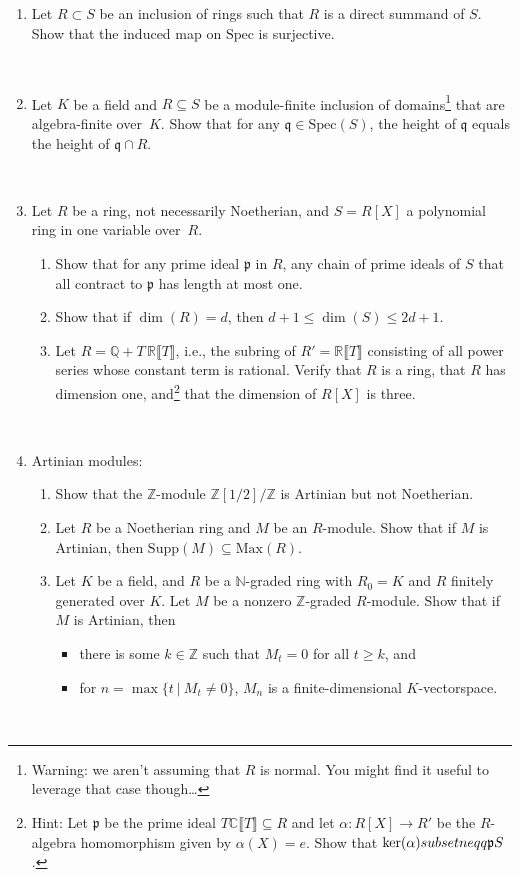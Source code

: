 \documentclass[12pt]{amsart}
\newcommand{\Q}{\mathbb{Q}}
\newcommand{\N}{\mathbb{N}}
\newcommand{\Z}{\mathbb{Z}}
\newcommand{\R}{\mathbb{R}}
\newcommand{\C}{\mathbb{C}}
\newcommand{\p}{\mathfrak{p}}
\newcommand{\q}{\mathfrak{q}}
\newcommand{\Spec}{\mathrm{Spec}}
\newcommand{\Supp}{\mathrm{Supp}}
\newcommand{\Max}{\mathrm{Max}}
\begin{document}
\begin{enumerate}

\item Let $R\subset S$ be an inclusion of rings such that $R$ is a direct summand of $S$. Show that the induced map on $\Spec$ is surjective.

\

\item Let $K$ be a field and $R\subseteq S$ be a module-finite inclusion of domains\footnote{Warning: we aren't assuming that $R$ is normal. You might find it useful to leverage that case though\dots} that are algebra-finite over~$K$. Show that  for any $\q \in \Spec(S)$, the height of $\q$ equals the height of $\q \cap R$.

\


\item Let $R$ be a ring, not necessarily Noetherian, and $S=R[X]$ a polynomial ring in one variable over~$R$.
\begin{enumerate} 
\item Show that for any prime ideal $\p$ in $R$, any chain of prime ideals of $S$ that all contract to $\p$ has length at most one.
\item Show that if $\dim(R)=d$, then $d+1 \leq \dim(S) \leq 2d+1$.
\item Let $R= \Q + T \,\R \llbracket T \rrbracket$, i.e., the subring of $R' = \R \llbracket T \rrbracket$ consisting of all power series whose constant term is rational. Verify that $R$ is a ring, that $R$ has dimension one, and\footnote{Hint: Let $\p$ be the prime ideal $T\C \llbracket T \rrbracket\subseteq R$ and let  $\alpha:R[X]\to R'$ be the $R$-algebra homomorphism given by $\alpha(X)=e$. Show that $\ker(\alpha) \\subsetneqq \p S$.} that the dimension of $R[X]$ is three.
\end{enumerate}



\



\item Artinian modules:
\begin{enumerate}
\item Show that the $\Z$-module $\Z[1/2]/\Z$ is Artinian but not Noetherian.
\item Let $R$ be a Noetherian ring and $M$ be an $R$-module. Show that if $M$ is Artinian, then ${\Supp(M)\subseteq \Max(R)}$.
\item Let $K$ be a field, and $R$ be a $\N$-graded ring with $R_0=K$ and $R$ finitely generated over $K$. Let $M$ be a nonzero $\Z$-graded $R$-module. Show that if $M$ is Artinian, then 
\begin{itemize}
\item there is some $k\in \Z$ such that $M_t=0$ for all $t\geq k$, and 
\item for $n=\max\{ t \ | \ M_t\neq 0\}$, $M_n$ is a finite-dimensional $K$-vectorspace.
\end{itemize}
\end{enumerate}

\



\end{enumerate}
\end{document}
